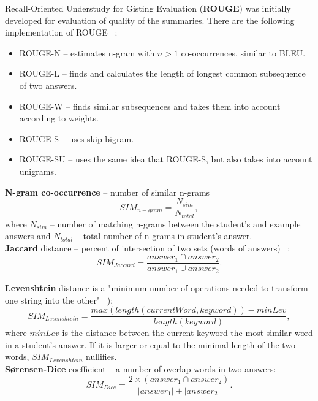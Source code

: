 Recall-Oriented Understudy for Gisting Evaluation (\textbf{ROUGE}) was initially developed for evaluation of quality of the summaries. There are the following implementation of ROUGE  ~\cite{Noorbehbahani}:
\begin{itemize}
\item ROUGE-N -- estimates n-gram with $n>1$ co-occurrences, similar to BLEU.
\item ROUGE-L -- finds and calculates the length of longest common subsequence of two answers.
\item ROUGE-W -- finds similar subsequences and takes them into account according to weights.
\item ROUGE-S -- uses skip-bigram.
\item ROUGE-SU -- uses the same idea that ROUGE-S, but also takes into account unigrams.
\end{itemize}

\textbf{N-gram co-occurrence} --  number of similar n-grams ~\cite{Noorbehbahani}
\begin{equation} \label{eq:n-gram}
SIM_{n-gram} = \frac{N_{sim}}{N_{total}},
\end{equation}
where $N_{sim}$ -- number of matching n-grams between the student's and example answers and $N_{total}$ -- total number of n-grams in student's answer.\\

\textbf{Jaccard} distance -- percent of intersection of two sets (words of answers) ~\cite{Li}:
\begin{equation} \label{eq:Jaccard}
SIM_{Jaccard} = \frac{answer_1 \cap answer_2}{answer_1 \cup answer_2}.
\end{equation}

\textbf{Levenshtein} distance is a "minimum number of operations needed to transform one string into the other" ~\cite{Gomaa}):
\begin{equation} \label{eq:Levenshtein}
SIM_{Levenshtein} = \frac{max(length(currentWord,keyword)) - minLev}{length(keyword)},
\end{equation}
where $minLev$ is the distance between the current keyword the most similar word in a student's answer. If it is larger or equal to the minimal length of the two words, $SIM_{Levenshtein}$ nullifies. \\

\textbf{S{\o}rensen-Dice} coefficient -- a number of overlap words in two answers:
\begin{equation} \label{eq:Dice}
SIM_{Dice} = \frac{2 \times (answer_1 \cap answer_2)}{|answer_1| + |answer_2|}.
\end{equation}


